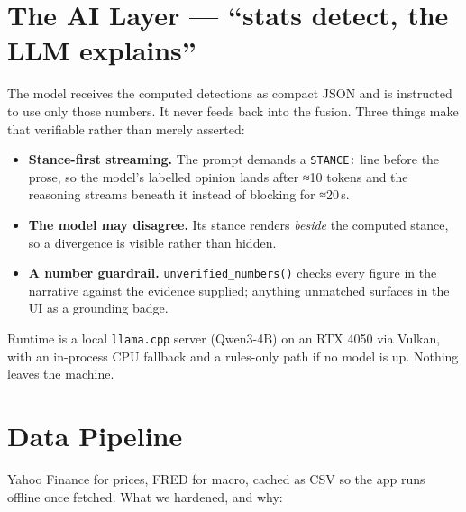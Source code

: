 \documentclass[11pt]{article}
\newcommand{\tk}[1]{\texttt{#1}}
\begin{document}
\section{The AI Layer — ``stats detect, the LLM explains''}
The model receives the computed detections as compact JSON and is instructed to use
only those numbers. It never feeds back into the fusion. Three things make that
verifiable rather than merely asserted:

\begin{itemize}
\item \textbf{Stance-first streaming.} The prompt demands a \tk{STANCE:} line before
the prose, so the model's labelled opinion lands after ≈10 tokens and the reasoning
streams beneath it instead of blocking for ≈20\,s.
\item \textbf{The model may disagree.} Its stance renders \emph{beside} the computed
stance, so a divergence is visible rather than hidden.
\item \textbf{A number guardrail.} \tk{unverified\_numbers()} checks every figure in
the narrative against the evidence supplied; anything unmatched surfaces in the UI as
a grounding badge.
\end{itemize}

Runtime is a local \tk{llama.cpp} server (Qwen3-4B) on an RTX 4050 via Vulkan, with an
in-process CPU fallback and a rules-only path if no model is up. Nothing leaves the
machine.

\section{Data Pipeline}
Yahoo Finance for prices, FRED for macro, cached as CSV so the app runs offline once
fetched. What we hardened, and why:
\end{document}
